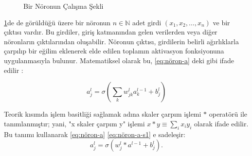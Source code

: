 \begin{figure}
    \centering
    \caption{Bir Nöronun Çalışma Şekli}
    \label{fig:nöron}
\end{figure}

\ref{fig:nöron}de de görüldüğü üzere bir nöronun $n\in\mathbb{N}$ adet girdi $(x_1, x_2,\dots,x_n)$ ve bir çıktısı vardır. Bu girdiler, giriş katmanından gelen verilerden veya diğer nöronların çıktılarından oluşabilir. Nöronun çıktısı, girdilerin belirli ağırlıklarla çarpılıp bir eğilim eklenerek elde edilen toplamın aktivasyon fonksiyonuna uygulanmasıyla bulunur. Matematiksel olarak bu, \eqref{eq:nöron-a} deki gibi ifade edilir \cite{nielsen2015neural}:

\begin{equation} 
    a^{l}_j = \sigma\left( \sum_k w^{l}_{jk} a^{l-1}_k + b^l_j\right)
    \label{eq:nöron-a}
\end{equation}


Teorik kısımda işlem basitliği sağlamak adına skaler çarpım işlemi $*$ operatörü ile tanımlanmıştır; yani, "x skaler çarpım y" işlemi $x * y \equiv \sum_i x_i y_i$ olarak ifade edilir. Bu tanımı kullanarak \eqref{eq:nöron-a} \eqref{eq:nöron-a-s1} e sadeleşir:
\begin{equation} 
    a^{l}_j = \sigma\left(w^l_j * a^{l-1}+b^l_j\right).
    \label{eq:nöron-a-s1}
\end{equation}

